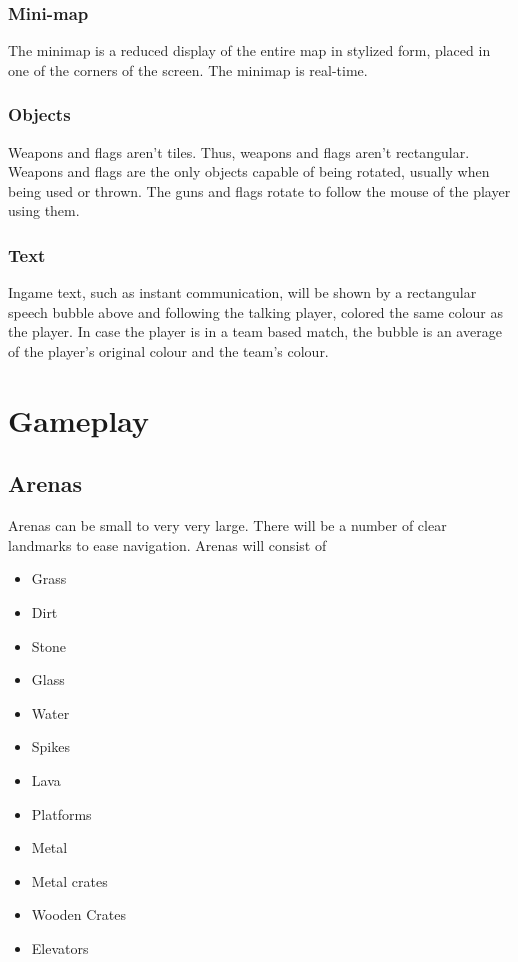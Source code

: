 \documentclass{article}
\begin{document}
\subsubsection{Mini-map}
The minimap is a reduced display of the entire map in stylized form, placed in one of the corners of the screen. The minimap is real-time.

\subsubsection{Objects}
Weapons and flags aren't tiles. Thus, weapons and flags aren't rectangular. Weapons and flags are the only objects capable of being rotated, usually when being used or thrown. The guns and flags rotate to follow the mouse of the player using them.

\subsubsection{Text}
Ingame text, such as instant communication, will be shown by a rectangular speech bubble above and following the talking player, colored the same colour as the player. In case the player is in a team based match, the bubble is an average of the player's original colour and the team's colour.

\section{Gameplay}
\subsection{Arenas}
\label{Arena}
Arenas can be small to very very large. There will be a number of clear landmarks to ease navigation. Arenas will consist of
\begin{itemize}
\item Grass
\item Dirt
\item Stone
\item Glass
\item Water
  \label{Hazards}
\item Spikes
\item Lava
\item Platforms
\item Metal
\item Metal crates
\item Wooden Crates
\item Elevators
\end{itemize}
\end{document}
